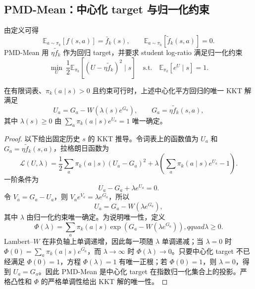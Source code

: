 \subsection{PMD-Mean：中心化 target 与归一化约束}
\label{sec:ch2-pmd-mean}

由定义可得
\[
\mathbb E_{a\sim\pi_k}[f(s,a)]=\bar f_k(s),
\qquad
\mathbb E_{a\sim\pi_k}[\widetilde f_k(s,a)]=0.
\]
PMD-Mean 用 $\eta\widetilde f_k$ 作为回归 target，并要求 student log-ratio 满足归一化约束
\begin{equation}
\label{eq:ch2-mean-loss}
\min_{U}\ \frac12\mathbb E_{\pi_k}\left[(U-\eta\widetilde f_k)^2\mid s\right]
\quad\text{s.t.}\quad
\mathbb E_{\pi_k}[e^{U}\mid s]=1.
\end{equation}

\begin{theorem}
\label{thm:ch2-mean-lambert}
在有限词表、$\pi_k(a\mid s)>0$ 且约束可行时，上述中心化平方回归的唯一 KKT 解满足
\begin{equation}
\label{eq:ch2-mean-lambert-theorem}
U_a=G_a-W\!\left(\lambda(s)e^{G_a}\right),\qquad
G_a=\eta\widetilde f_k(s,a),
\end{equation}
其中 $\lambda(s)\geq0$ 由 $\sum_a\pi_k(a\mid s)e^{U_a}=1$ 唯一确定。
\end{theorem}

\begin{proof}
以下给出固定历史 $s$ 的 KKT 推导。令词表上的函数值为 $U_a$ 和 $G_a=\eta\widetilde f_k(s,a)$，拉格朗日函数为
\[
\mathscr L(U,\lambda)
=\frac12\sum_a\pi_k(a\mid s)(U_a-G_a)^2
+\lambda\left(\sum_a\pi_k(a\mid s)e^{U_a}-1\right).
\]
一阶条件为
\[
U_a-G_a+\lambda e^{U_a}=0.
\]
令 $V_a=G_a-U_a$，则 $V_a e^{V_a}=\lambda e^{G_a}$，所以
\begin{equation}
\label{eq:ch2-mean-lambert}
U_a=G_a-W\!\left(\lambda e^{G_a}\right),
\end{equation}
其中 $\lambda$ 由归一化约束唯一确定。为说明唯一性，定义
\[
\Phi(\lambda)=\sum_a\pi_k(a\mid s)\exp\!\left(G_a-W(\lambda e^{G_a})\right),qquad \lambda\geq0.
\]
Lambert--$W$ 在非负轴上单调递增，因此每一项随 $\lambda$ 单调递减；当 $\lambda=0$ 时 $\Phi(0)=\sum_a\pi_k(a\mid s)e^{G_a}$，而 $\lambda\to\infty$ 时 $\Phi(\lambda)\to0$。只要中心化 target 不已经满足 $\Phi(0)=1$，方程 $\Phi(\lambda)=1$ 有唯一正根；若 $\Phi(0)=1$，则 $\lambda=0$，得到 $U_a=G_a$。因此 PMD-Mean 是中心化 target 在指数归一化集合上的投影。严格凸性和 $\Phi$ 的严格单调性给出 KKT 解的唯一性。
\end{proof}

